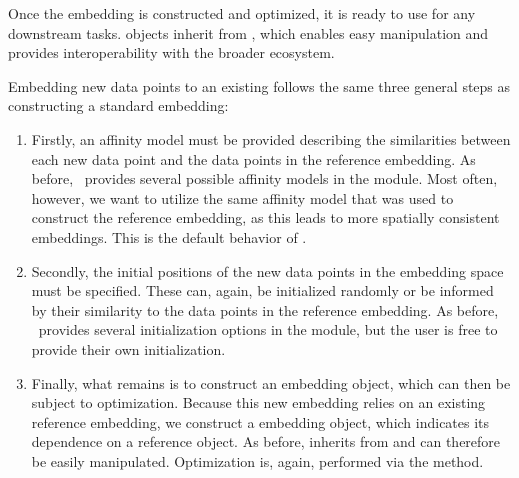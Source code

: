 \documentclass[article]{jss}
\newcommand{\opentsne}{\pkg{openTSNE}}
\begin{document}
Once the embedding is constructed and optimized, it is ready to use for any downstream tasks.  objects inherit from , which enables easy manipulation and provides interoperability with the broader  ecosystem.

Embedding new data points to an existing 
follows the same three general steps as constructing a standard embedding:
\begin{enumerate}
\item Firstly, an affinity model must be provided describing the similarities between each new data point and the data points in the reference embedding. As before, \opentsne\ provides several possible affinity models in the  module. Most often, however, we want to utilize the same affinity model that was used to construct the reference embedding, as this leads to more spatially consistent embeddings. This is the default behavior of \opentsne.


\item Secondly, the initial positions of the new data points in the embedding space must be specified. These can, again, be initialized randomly or be informed by their similarity to the data points in the reference embedding. As before, \opentsne\ provides several initialization options in the  module, but the user is free to provide their own initialization.

\item Finally, what remains is to construct an embedding object, which can then be subject to optimization. Because this new embedding relies on an existing reference embedding, we construct a  embedding object, which indicates its dependence on a reference  object. As before,  inherits from  and can therefore be easily manipulated. Optimization is, again, performed via the  method.
\end{enumerate}
\end{document}
